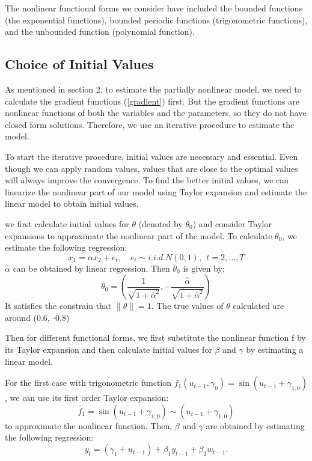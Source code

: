 \documentclass[a4paper,12pt,times,numbered,print,index]{report}
\numberwithin{equation}{section}
\begin{document}
The nonlinear functional forms we consider have included the bounded functions (the exponential functions), bounded periodic functions (trigonometric functions), and the unbounded function (polynomial function). 

\subsection{Choice of Initial Values}

As mentioned in section 2, to estimate the partially nonlinear model, we need to calculate the gradient functions (\ref{gradient}) first. But the gradient functions are nonlinear functions of both the variables and the parameters, so they do not have closed form solutions. Therefore, we use an iterative procedure to estimate the model. 

To start the iterative procedure, initial values are necessary and essential. Even though we can apply random values, values that are close to the optimal values will always improve the convergence. To find the better initial values, we can linearize the nonlinear part of our model using Taylor expansion and estimate the linear model to obtain initial values. 

we first calculate initial values for $\theta$ (denoted by $\theta_{0}$) and consider Taylor expansions to approximate the nonlinear part of the model. To calculate $\theta_{0}$, we estimate the following regression:
$$
x_1 = \alpha x_2 + e_t, \quad e_{t}\sim i.i.d.N\left( 0,1\right) ,\ \ t=2,...,T
$$
$\hat{\alpha}$ can be obtained by linear regression. Then $\theta_0$ is given by:
$$
\theta_{0} = (\dfrac{1}{\sqrt{1+\hat{\alpha}^2}}, -\dfrac{\hat{\alpha}}{\sqrt{1+\hat{\alpha}^2}})
$$
It satisfies the constrain that $\|\theta\| = 1$. 
The true values of $\theta$ calculated are around (0.6, -0.8)


Then for different functional forms, we first substitute the nonlinear function f by its Taylor expansion and then calculate initial values for $\beta$ and $\gamma$ by estimating a linear model.

For the first case with trigonometric function $f_{1}\left( u_{t-1},\gamma _{0}\right) =\sin \left( u_{t-1}+\gamma_{1,0}\right)$, we can use its first order Taylor expansion: 
$$
\tilde{f_1} = \sin \left( u_{t-1}+\gamma_{1,0}\right) \sim \left( u_{t-1}+\gamma_{1,0}\right) 
$$ 
to approximate the nonlinear function. Then, $\beta$ and $\gamma$ are obtained by estimating the following regression:
$$
y_t = \left( \gamma_{1} + u_{t-1}\right)  + \beta_{1}y_{t-1} + \beta_2w_{t-1}.
$$
\end{document}
